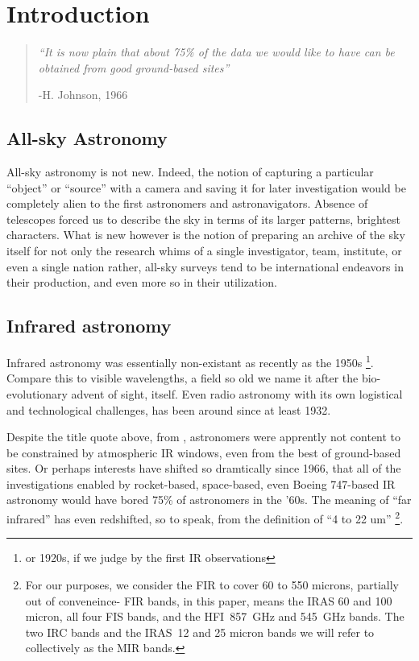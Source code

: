 \section{Introduction}
  \label{ch:intro}
  \begin{quotation}
    \small
    \textit{``It is now plain that about 75\% of the data we would like to have can be obtained from good ground-based sites''}

    -H. Johnson, 1966
  \end{quotation}

\subsection{All-sky Astronomy}


    All-sky astronomy is not new. Indeed, the notion of capturing a particular ``object'' or ``source'' with a camera and saving it for later investigation would be completely alien to the first astronomers and astronavigators. Absence of telescopes forced us to describe the sky in terms of its larger patterns, brightest characters. What is new however is the notion of preparing an archive of the sky itself for not only the research whims of a single investigator, team, institute, or even a single nation\- rather, all-sky surveys tend to be international endeavors in their production, and even more so in their utilization.


  \subsection{Infrared astronomy}

  Infrared astronomy was essentially non-existant as recently as the 1950s \citep{johnson66} \footnote{or 1920s, if we judge by the first IR observations}. Compare this to visible wavelengths, a field so old we name it after the bio-evolutionary advent of sight, itself. Even radio astronomy with its own logistical and technological challenges, has been around since at least 1932.


  Despite the title quote above, from \citep{johnson66}, astronomers were apprently not content to be constrained by atmospheric IR windows, even from the best of ground-based sites. Or perhaps interests have shifted so dramtically since 1966, that all of the investigations enabled by rocket-based, space-based, even Boeing 747-based IR astronomy would have bored 75\% of astronomers in the '60s. The meaning of ``far infrared'' has even redshifted, so to speak, from the \cite{johnson66} definition of ``4 to 22 um''
   \footnote{\footnotesize For our purposes, we consider the FIR to cover 60 to 550 microns, partially out of conveneince- FIR bands, in this paper, means the IRAS 60 and 100 micron, all four FIS bands, and the HFI~857~GHz and 545~GHz bands. The two IRC bands and the IRAS~12 and 25 micron bands we will refer to collectively as the MIR bands.}.

